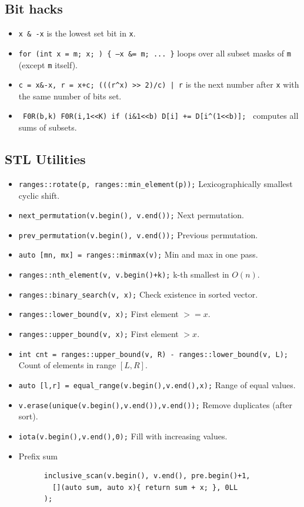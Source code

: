 	\subsection{Bit hacks}
		\begin{itemize}
			\item \texttt{x \& -x} is the lowest set bit in \texttt{x}.
			\item \texttt{for (int x = m; x; ) \{ --x \&= m; ... \}} loops over all subset masks of \texttt{m} (except \texttt{m} itself).
			\item \texttt{c = x\&-x, r = x+c; (((r\^{}x) >> 2)/c) | r} is the next number after \texttt{x} with the same number of bits set.
			\item \texttt{ F0R(b,k) F0R(i,1<<K) if (i\&1<<b) D[i] += D[i\^{}(1<<b)]; } computes all sums of subsets.
		\end{itemize}
  \subsection{STL Utilities}
		\begin{itemize}
			\item \lstinline{ranges::rotate(p, ranges::min_element(p));} Lexicographically smallest cyclic shift.
			\item \lstinline{next_permutation(v.begin(), v.end());} Next permutation.
      \item \lstinline{prev_permutation(v.begin(), v.end());} Previous permutation.
      \item \lstinline{auto [mn, mx] = ranges::minmax(v);} Min and max in one pass.
      \item \lstinline{ranges::nth_element(v, v.begin()+k);} k-th smallest in $O(n)$.
      \item \lstinline{ranges::binary_search(v, x);} Check existence in sorted vector.
      \item \lstinline{ranges::lower_bound(v, x);} First element $>= x$.
      \item \lstinline{ranges::upper_bound(v, x);} First element $> x$.
      \item \lstinline{int cnt = ranges::upper_bound(v, R) - ranges::lower_bound(v, L);} Count of elements in range $[L,R]$.
      \item \lstinline{auto [l,r] = equal_range(v.begin(),v.end(),x);} Range of equal values.
      \item \lstinline{v.erase(unique(v.begin(),v.end()),v.end());} Remove duplicates (after sort).
      \item \lstinline{iota(v.begin(),v.end(),0);} Fill with increasing values.
      \item Prefix sum
      \begin{lstlisting}
      inclusive_scan(v.begin(), v.end(), pre.begin()+1,
        [](auto sum, auto x){ return sum + x; }, 0LL
      );
      \end{lstlisting}
		\end{itemize}
